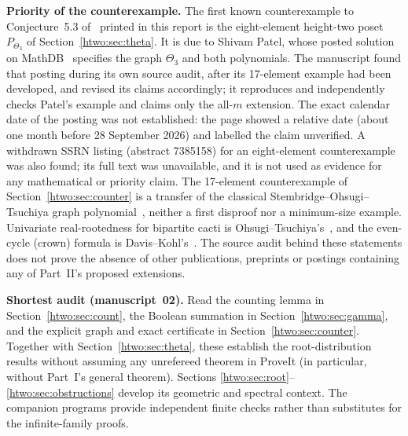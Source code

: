 \documentclass[11pt]{article}
\numberwithin{equation}{section}
\theoremstyle{definition}
\begin{document}
\begin{statusbox}
\small\textbf{Priority of the counterexample.} The first known counterexample
to Conjecture~5.3 of~\cite{AC} printed in this report is the eight-element
height-two poset $P_{\Theta_3}$ of Section~\ref{htwo:sec:theta}. It is due to
Shivam Patel, whose posted solution on MathDB~\cite{Patel} specifies the graph
$\Theta_3$ and both polynomials. The manuscript found that posting during its
own source audit, after its 17-element example had been developed, and
revised its claims accordingly; it reproduces and independently checks
Patel's example and claims only the all-$m$ extension. The exact calendar
date of the posting was not established: the page showed a relative date
(about one month before 28 September 2026) and labelled the claim unverified.
A withdrawn SSRN listing (abstract 7385158) for an eight-element
counterexample was also found; its full text was unavailable, and it is not
used as evidence for any mathematical or priority claim. The 17-element
counterexample of Section~\ref{htwo:sec:counter} is a transfer of the
classical Stembridge--Ohsugi--Tsuchiya graph polynomial~\cite{Stembridge,OT20},
neither a first disproof nor a minimum-size example. Univariate
real-rootedness for bipartite cacti is Ohsugi--Tsuchiya's~\cite[Theorem~7.2]{OT21},
and the even-cycle (crown) formula is Davis--Kohl's~\cite{DK}. The source audit
behind these statements does not prove the absence of other publications,
preprints or postings containing any of Part~II's proposed extensions.
\end{statusbox}

\begin{statusbox}
\small\textbf{Shortest audit (manuscript~02).} Read the counting lemma in
Section~\ref{htwo:sec:count}, the Boolean summation in
Section~\ref{htwo:sec:gamma}, and the explicit graph and exact certificate in
Section~\ref{htwo:sec:counter}. Together with Section~\ref{htwo:sec:theta}, these establish the root-distribution
results without assuming any unrefereed theorem in ProveIt (in particular,
without Part~I's general theorem). Sections
\ref{htwo:sec:root}--\ref{htwo:sec:obstructions} develop its geometric and spectral
context. The companion programs provide independent finite checks rather
than substitutes for the infinite-family proofs.
\end{statusbox}
\end{document}
